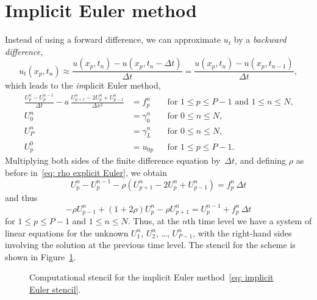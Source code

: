 \section{Implicit Euler method}

Instead of using a forward difference, we can approximate $u_t$ by a 
\emph{backward difference},
\[
u_t(x_p,t_n)\approx\frac{u(x_p,t_n)-u(x_p,t_n-\Delta t)}{\Delta t}
	=\frac{u(x_p,t_n)-u(x_p,t_{n-1})}{\Delta t},
\]
which leads to the \emph{im}plicit Euler method,
\begin{equation}\label{eq: implicit Euler 1d}
\begin{aligned}
\frac{U^n_p-U^{n-1}_p}{\Delta t}
	-a\,\frac{U^n_{p+1}-2U^n_p+U^n_{p-1}}{\Delta x^2}&=f^n_p&
&\text{for $1\le p\le P-1$ and $1\le n\le N$,}\\
U^n_0&=\gamma_0^n&&\text{for $0\le n\le N$,}\\
U^n_P&=\gamma_L^n&&\text{for $0\le n\le N$,}\\
U^0_p&=u_{0p}&&\text{for $1\le p\le P-1$.}
\end{aligned}
\end{equation}
Multiplying both sides of the finite difference equation by~$\Delta t$, and 
defining $\rho$ as before in~\eqref{eq: rho explicit Euler}, we obtain
\[
U^n_p-U^{n-1}_p-\rho(U^n_{p+1}-2U^n_p+U^n_{p-1})=f^n_p\,\Delta t
\]
and thus
\begin{equation}\label{eq: implicit Euler stencil}
-\rho U^n_{p-1}+(1+2\rho)U^n_p-\rho U^n_{p+1}=U^{n-1}_p+f^n_p\,\Delta t
\end{equation}
for $1\le p\le P-1$ and $1\le n\le N$.  Thus, at the $n$th time level we have a 
system of linear equations for the unknown $U^n_1$, $U^n_2$, \dots, $U^n_{P-1}$,
with the right-hand sides involving the solution at the previous time level.
The stencil for the scheme is shown in Figure~\ref{fig: implicit Euler stencil}.

\begin{figure}\label{fig: implicit Euler stencil}
\caption{Computational stencil for the implicit Euler 
method~\eqref{eq: implicit Euler stencil}.}
\begin{center}
\end{center}
\end{figure}

